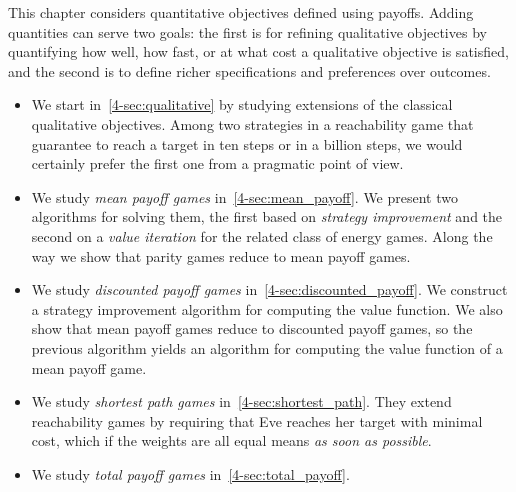 

This chapter considers quantitative objectives defined using payoffs. 
Adding quantities can serve two goals:
the first is for refining qualitative objectives by quantifying how well, how fast, or at what cost a qualitative objective is satisfied,
and the second is to define richer specifications and preferences over outcomes.
\begin{itemize}
	\item We start in~\cref{4-sec:qualitative} by studying extensions of the classical qualitative objectives. Among two strategies in a reachability game that guarantee to reach a target in ten steps or in a billion steps, we would certainly prefer the first one from a pragmatic point of view.

	\item We study \emph{mean payoff games} in~\cref{4-sec:mean_payoff}. 
	We present two algorithms for solving them, the first based on \emph{strategy improvement} and the second on a \emph{value iteration} for the related class of energy games.
	Along the way we show that parity games reduce to mean payoff games.

	\item We study \emph{discounted payoff games} in~\cref{4-sec:discounted_payoff}.
	We construct a strategy improvement algorithm for computing the value function.
	We also show that mean payoff games reduce to discounted payoff games, so the previous algorithm yields an algorithm for computing the value function of a mean payoff game.

	\item We study \emph{shortest path games} in~\cref{4-sec:shortest_path}.
	They extend reachability games by requiring that Eve reaches her target with minimal cost, 
	which if the weights are all equal means \emph{as soon as possible}.
	
	\item We study \emph{total payoff games} in~\cref{4-sec:total_payoff}.
\end{itemize}
